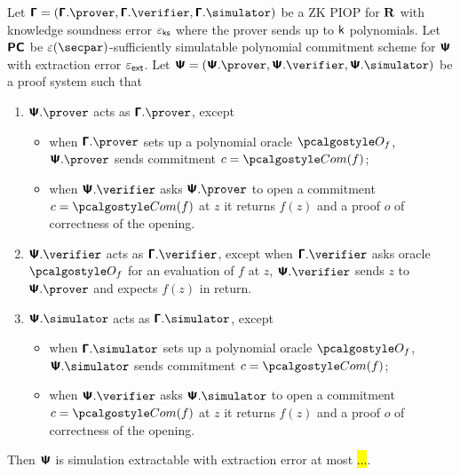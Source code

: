 \documentclass[runningheads,11pt]{llncs}
\begin{document}
\begin{theorem}
  Let $\PIOP = (\PIOP.\prover, \PIOP.\verifier, \PIOP.\simulator)$ be a ZK PIOP
  for $\mathbf{R}$ with knowledge soundness error $\varepsilon_{\mathsf{ks}}$ where the prover sends up
  to $\mathsf{k}$ polynomials. Let $\bm{\mathsf{PC}}$ be $\eps(\secpar)$-sufficiently
  simulatable polynomial commitment scheme for $\bm{\mathsf{\Psi}}$ with extraction error
  $\varepsilon_{\mathsf{ext}}$. Let $\PS = (\PS.\prover, \PS.\verifier, \PS.\simulator)$ be a proof system such
  that
  \begin{enumerate}
  \item $\PS.\prover$ acts as $\PIOP.\prover$, except
    \begin{itemize}
    \item when $\PIOP.\prover$ sets up a polynomial oracle $\oracleo_f$,
      $\PS.\prover$ sends commitment $c = \com(f)$;
    \item when $\PS.\verifier$ asks $\PS.\prover$ to open a commitment
      $c = \com(f)$ at $z$ it returns $f(z)$ and a proof $o$ of correctness of
      the opening.
  \end{itemize}
  \item $\PS.\verifier$ acts as $\PIOP.\verifier$, except when $\PIOP.\verifier$
    asks oracle $\oracleo_f$ for an evaluation of $f$ at $z$, $\PS.\verifier$
    sends $z$ to $\PS.\prover$ and expects $f(z)$ in return.
  \item $\PS.\simulator$ acts as $\PIOP.\simulator$, except
     \begin{itemize}
    \item when $\PIOP.\simulator$ sets up a polynomial oracle $\oracleo_f$,
      $\PS.\simulator$ sends commitment $c = \com(f)$;
    \item when $\PS.\verifier$ asks $\PS.\simulator$ to open a commitment
      $c = \com(f)$ at $z$ it returns $f(z)$ and a proof $o$ of correctness of
      the opening.
  \end{itemize}
  \end{enumerate}
  Then $\bm{\mathsf{\Psi}}$ is simulation extractable with extraction error at most \hl{...}.
\end{theorem}
\end{document}
